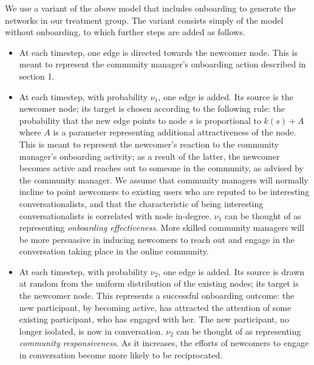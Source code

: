 We use a variant of the above model that includes onboarding to generate the networks in our treatment group. The variant consists simply of the model without onboarding, to which further steps are added as follows.
\begin{itemize}
\item At each timestep, one edge is directed towards the newcomer node. This is meant to represent the community manager's onboarding action described in section 1. 
\item At each timestep, with probability $\nu_1$, one edge is added. Its source is the newcomer node; its target is chosen according to the following rule: the probability that the new edge points to node $s$ is proportional to $k(s) + A$ where $A$ is a parameter representing additional attractiveness of the node. This is meant to represent the newcomer's reaction to the community manager's onboarding activity; as a result of the latter, the newcomer becomes active and reaches out to someone in the community, as advised by the community manager. We assume that community managers will normally incline to point newcomers to existing users who are reputed to be interesting conversationalists, and that the characteristic of being interesting conversationalists is correlated with node in-degree. $\nu_1$ can be thought of as representing \emph{onboarding effectiveness}. More skilled community managers will be more persuasive in inducing newcomers to reach out and engage in the conversation taking place in the online community.
\item At each timestep, with probability $\nu_2$, one edge is added. Its source is drawn at random from the uniform distribution of the existing nodes; its target is the newcomer node. This represents a successful onboarding outcome: the new participant, by becoming active, has attracted the attention of some existing participant, who has engaged with her. The new participant, no longer isolated, is now in conversation. $\nu_2$ can be thought of as representing \emph{community responsiveness}. As it increases, the efforts of newcomers to engage in conversation become more likely to be reciprocated.
\end{itemize}
